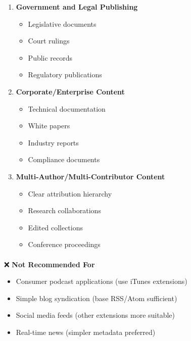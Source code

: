 \documentclass[
  letterpaper,
  DIV=11,
  numbers=noendperiod]{scrartcl}
\makeatletter
\let\oldparagraph\paragraph
\renewcommand{\paragraph}{
    \@ifstar
      \xxxParagraphStar
      \xxxParagraphNoStar
  }
\newcommand{\xxxParagraphStar}[1]{\oldparagraph*{#1}\mbox{}}
\newcommand{\xxxParagraphNoStar}[1]{\oldparagraph{#1}\mbox{}}
\providecommand{\tightlist}{%
  \setlength{\itemsep}{0pt}\setlength{\parskip}{0pt}}\usepackage{longtable,booktabs,array}
\makeatother
\begin{document}
\begin{enumerate}
\def\labelenumi{\arabic{enumi}.}
\setcounter{enumi}{2}
\tightlist
\item
  \textbf{Government and Legal Publishing}

  \begin{itemize}
  \tightlist
  \item
    Legislative documents
  \item
    Court rulings
  \item
    Public records
  \item
    Regulatory publications
  \end{itemize}
\item
  \textbf{Corporate/Enterprise Content}

  \begin{itemize}
  \tightlist
  \item
    Technical documentation
  \item
    White papers
  \item
    Industry reports
  \item
    Compliance documents
  \end{itemize}
\item
  \textbf{Multi-Author/Multi-Contributor Content}

  \begin{itemize}
  \tightlist
  \item
    Clear attribution hierarchy
  \item
    Research collaborations
  \item
    Edited collections
  \item
    Conference proceedings
  \end{itemize}
\end{enumerate}

\paragraph{\texorpdfstring{❌ \textbf{Not Recommended
For}}{❌ Not Recommended For}}\label{not-recommended-for}

\begin{itemize}
\tightlist
\item
  Consumer podcast applications (use iTunes extensions)
\item
  Simple blog syndication (base RSS/Atom sufficient)
\item
  Social media feeds (other extensions more suitable)
\item
  Real-time news (simpler metadata preferred)
\end{itemize}
\end{document}
